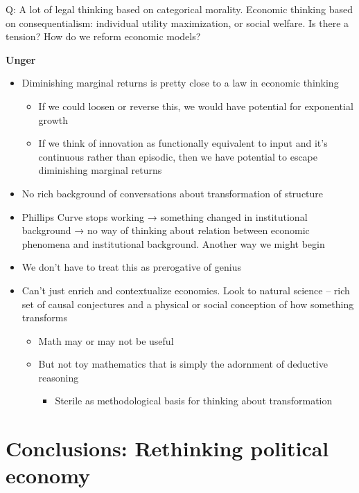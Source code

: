 Q: A lot of legal thinking based on categorical morality. Economic
thinking based on consequentialism: individual utility maximization, or
social welfare. Is there a tension? How do we reform economic models?

\textbf{Unger}

\begin{itemize}
\tightlist
\item
  Diminishing marginal returns is pretty close to a law in economic
  thinking

  \begin{itemize}
  \tightlist
  \item
    If we could loosen or reverse this, we would have potential for
    exponential growth
  \item
    If we think of innovation as functionally equivalent to input and
    it's continuous rather than episodic, then we have potential to
    escape diminishing marginal returns
  \end{itemize}
\item
  No rich background of conversations about transformation of structure
\item
  Phillips Curve stops working → something changed in institutional
  background → no way of thinking about relation between economic
  phenomena and institutional background. Another way we might begin
\item
  We don't have to treat this as prerogative of genius
\item
  Can't just enrich and contextualize economics. Look to natural science
  -- rich set of causal conjectures and a physical or social conception
  of how something transforms

  \begin{itemize}
  \tightlist
  \item
    Math may or may not be useful
  \item
    But not toy mathematics that is simply the adornment of deductive
    reasoning

    \begin{itemize}
    \tightlist
    \item
      Sterile as methodological basis for thinking about transformation
    \end{itemize}
  \end{itemize}
\end{itemize}

\hypertarget{conclusions-rethinking-political-economy}{%
\section{Conclusions: Rethinking political
economy}\label{conclusions-rethinking-political-economy}}

